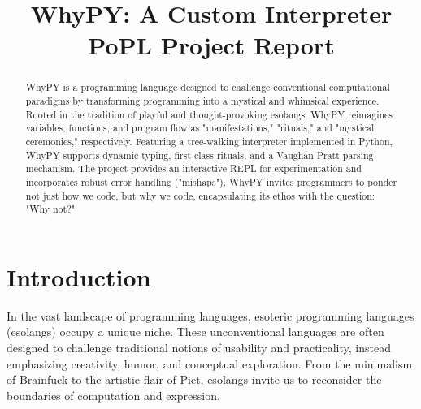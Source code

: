 \documentclass[conference]{IEEEtran}
\begin{document}


\title{WhyPY: A Custom Interpreter \\ \Large{PoPL Project Report}}

\author{
  \and
}

\maketitle

\begin{abstract}
WhyPY is a programming language designed to challenge conventional computational paradigms by transforming programming into a mystical and whimsical experience. Rooted in the tradition of playful and thought-provoking esolangs, WhyPY reimagines variables, functions, and program flow as "manifestations," "rituals," and "mystical ceremonies," respectively. Featuring a tree-walking interpreter implemented in Python, WhyPY supports dynamic typing, first-class rituals, and a Vaughan Pratt parsing mechanism. The project provides an interactive REPL for experimentation and incorporates robust error handling ("mishaps"). WhyPY invites programmers to ponder not just how we code, but why we code, encapsulating its ethos with the question: "Why not?"
\end{abstract}





\section{Introduction}
In the vast landscape of programming languages, esoteric programming languages (esolangs) occupy a unique niche. These unconventional languages are often designed to challenge traditional notions of usability and practicality, instead emphasizing creativity, humor, and conceptual exploration. From the minimalism of Brainfuck to the artistic flair of Piet, esolangs invite us to reconsider the boundaries of computation and expression.
\end{document}
